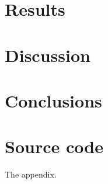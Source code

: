 \documentclass[a4paper,11pt]{kth-mag}
\begin{document}
\chapter{Results}\label{chap:results}
    
\chapter{Discussion}\label{chap:discussion}
    
\chapter{Conclusions}\label{chap:conclusions}
    
\nocite{*}
\printbibliography{}

\appendix
\chapter{Source code}\label{appendix:sourcecode}

The appendix.
\end{document}
